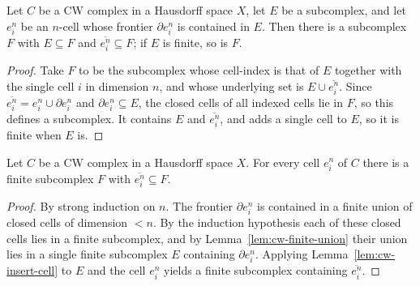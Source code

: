 \begin{lemma}
    \label{lem:cw-insert-cell}
    \leanok
    Let $C$ be a CW complex in a Hausdorff space $X$, let $E$ be a subcomplex,
    and let $e^n_i$ be an $n$-cell whose frontier $\partial e^n_i$ is contained
    in $E$. Then there is a subcomplex $F$ with $E \subseteq F$ and
    $\overline{e^n_i} \subseteq F$; if $E$ is finite, so is $F$.
\end{lemma}
\begin{proof}
    Take $F$ to be the subcomplex whose cell-index is that of $E$ together with
    the single cell $i$ in dimension $n$, and whose underlying set is
    $E \cup \overline{e^n_i}$. Since $\overline{e^n_i} = e^n_i \cup
    \partial e^n_i$ and $\partial e^n_i \subseteq E$, the closed cells of all
    indexed cells lie in $F$, so this defines a subcomplex. It contains $E$ and
    $\overline{e^n_i}$, and adds a single cell to $E$, so it is finite when $E$
    is.
\end{proof}

\begin{lemma}
    \label{lem:cw-cell-finite-subcomplex}
    \leanok
    Let $C$ be a CW complex in a Hausdorff space $X$. For every cell $e^n_i$ of
    $C$ there is a finite subcomplex $F$ with $\overline{e^n_i} \subseteq F$.
\end{lemma}
\begin{proof}
    By strong induction on $n$. The frontier $\partial e^n_i$ is contained in a
    finite union of closed cells of dimension $< n$. By the induction
    hypothesis each of these closed cells lies in a finite subcomplex, and by
    Lemma~\ref{lem:cw-finite-union} their union lies in a single finite
    subcomplex $E$ containing $\partial e^n_i$. Applying
    Lemma~\ref{lem:cw-insert-cell} to $E$ and the cell $e^n_i$ yields a finite
    subcomplex containing $\overline{e^n_i}$.
\end{proof}

